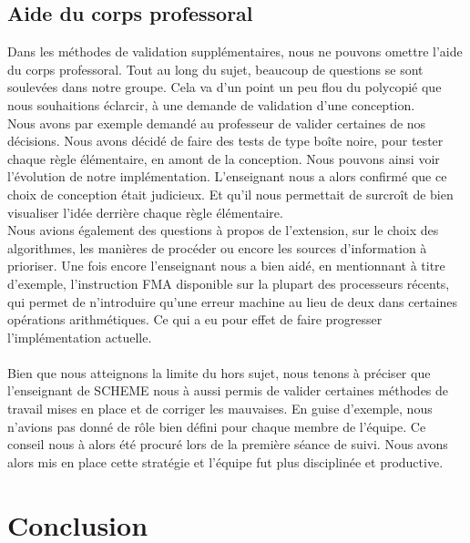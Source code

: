 \documentclass{article}
\begin{document}
\subsection{Aide du corps professoral}

Dans les méthodes de validation supplémentaires, nous ne pouvons omettre l'aide du corps professoral. Tout au long du sujet, beaucoup de questions se sont soulevées
dans notre groupe. Cela va d'un point un peu flou du polycopié que nous souhaitions éclarcir, à une demande de validation d'une conception. \\
Nous avons par exemple demandé au professeur de valider certaines de nos décisions. Nous avons décidé de faire des tests de type boîte noire, pour tester
chaque règle élémentaire, en amont de la conception. Nous pouvons ainsi voir l'évolution de notre implémentation. L'enseignant nous a alors confirmé que ce choix de
conception était judicieux. Et qu'il nous permettait de surcroît de bien visualiser l'idée derrière chaque règle élémentaire.\\
Nous avions également des questions à propos de l'extension, sur le choix des algorithmes, les manières de procéder ou encore les sources d'information à prioriser.
Une fois encore l'enseignant nous a bien aidé, en mentionnant à titre d'exemple, l'instruction FMA disponible sur la plupart des processeurs récents, qui permet
de n'introduire qu'une erreur machine au lieu de deux dans certaines opérations arithmétiques. Ce qui a eu pour effet de faire progresser l'implémentation actuelle.\\
\\
Bien que nous atteignons la limite du hors sujet, nous tenons à préciser que l'enseignant de SCHEME nous à aussi permis de valider certaines méthodes de travail mises en place et de
corriger les mauvaises. En guise d'exemple, nous n'avions pas donné de rôle bien défini pour chaque membre de l'équipe. Ce conseil nous à alors été procuré lors de la première
séance de suivi. Nous avons alors mis en place cette stratégie et l'équipe fut plus disciplinée et productive.

\section{Conclusion}
\end{document}
